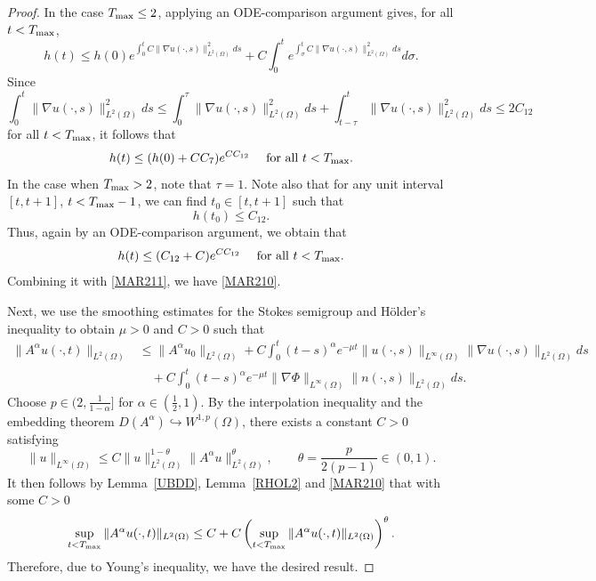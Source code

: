 \documentclass{amsart}
\numberwithin{equation}{section}
\begin{document}
\begin{proof}
In the case $T_{\rm max}\le2$,
applying an ODE-comparison argument gives, for all $t< T_{\rm max}$,
\[
h(t)\le h(0)e^{\int_{0}^{t}C\|\nabla u(\cdot,s)\|_{L^{2}(\Omega)}^{2}ds}+C\int_{0}^{t}e^{\int_{\sigma}^{t}C\|\nabla u(\cdot,s)\|_{L^{2}(\Omega)}^{2}ds} d\sigma.
\]
Since
\[
\int_{0}^{t}\|\nabla u(\cdot,s)\|_{L^{2}(\Omega)}^{2}ds\le \int_{0}^{\tau}\|\nabla u(\cdot,s)\|_{L^{2}(\Omega)}^{2}ds+\int_{t-\tau}^{t}\|\nabla u(\cdot,s)\|_{L^{2}(\Omega)}^{2}ds\le 2C_{12}
\]
for all $t<T_{\rm max}$, it follows that
\begin{equation}\label{MAR211}
h(t)\le (h(0)+CC_{7})e^{CC_{12}}\quad\mbox{ for all }t< T_{\rm max}.
\end{equation}
In the case when $T_{\rm max}>2$, note that $\tau=1$. Note also that
for any unit interval $[t,t+1]$,  $t<T_{\rm max}-1$, we can find $t_0\in[t,t+1]$ such that
\[
h(t_0)\le C_{12}.
\]
Thus, again by an ODE-comparison argument, we obtain that 
\[
h(t)\le (C_{12}+C)e^{CC_{12}}\quad\mbox{ for all }t <T_{\rm max}.
\]
Combining it with \eqref{MAR211}, we have \eqref{MAR210}.

Next, we use the smoothing estimates for the Stokes semigroup  and H\"older's inequality
to obtain $\mu>0$ and $C>0$ such that
\[
\begin{aligned}
\|A^{\alpha}u(\cdot,t)\|_{L^{2}(\Omega)}
&\le \|A^{\alpha}u_{0}\|_{L^{2}(\Omega)}+C\int_{0}^{t}(t-s)^{\alpha}e^{-\mu t} \|  u(\cdot,s)\|_{L^{\infty}(\Omega)} \|\nabla u(\cdot,s)\|_{L^{2}(\Omega)} ds
\\&\quad+C\int_{0}^{t}(t-s)^{\alpha}e^{-\mu t}\|\nabla \Phi\|_{L^{\infty}(\Omega)}\|n(\cdot,s)\|_{L^{2}(\Omega)}ds.
\end{aligned}
\]
Choose $p\in(2, \frac{1}{1-\alpha}]$ for $\alpha \in (\frac{1}{2}, 1)$. 
By the interpolation inequality and the embedding theorem $D(A^{\alpha})\hookrightarrow W^{1,p}(\Omega)$, there exists a constant $C>0$ satisfying
\begin{equation}\label{UEMB}
\| u\|_{L^{\infty}(\Omega)}\le C\| u\|_{L^{2}(\Omega)}^{1-\theta} \|A^{\alpha}  u\|_{L^{2}(\Omega)}^{\theta},\qquad \theta=\frac{p}{2(p-1)}\in(0,1).
\end{equation}
It then follows by Lemma~\ref{UBDD},  Lemma~\ref{RHOL2} and \eqref{MAR210} that with some $C>0$
\[
\sup_{t<T_{\rm max}}\|A^{\alpha}u(\cdot,t)\|_{L^{2}(\Omega)}\le C+C \left(\sup_{t<T_{\rm max}}\|A^{\alpha}u(\cdot,t)\|_{L^{2}(\Omega)} \right)^{\theta}.
\]
Therefore, due to Young's inequality, we have the desired result.
\end{proof}
\end{document}
